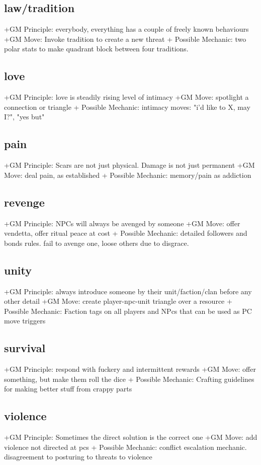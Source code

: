 \documentclass{tufte-handout}
\begin{document}
\subsection{law/tradition}
+GM Principle: everybody, everything has a couple of freely known behaviours
+GM Move: Invoke tradition to create a new threat
+ Possible Mechanic: two polar stats to make quadrant block between four traditions. 

\subsection{love}
+GM Principle:  love is steadily rising level of intimacy
+GM Move: spotlight a connection or triangle
+ Possible Mechanic: intimacy moves: 	 "i'd like to X, may I?", "yes but"

\subsection{pain}
+GM Principle: Scars are not just physical. Damage is not just permanent
+GM Move: deal pain, as established
+ Possible Mechanic: memory/pain as addiction 

\subsection{revenge}

+GM Principle: NPCs will always be avenged by someone
+GM Move:  offer vendetta, offer ritual peace at cost
+ Possible Mechanic: detailed followers and bonds rules. fail to avenge one, loose others due to disgrace.

\subsection{unity}
+GM Principle: always introduce someone by their unit/faction/clan before any other detail	
+GM Move: create player-npc-unit triangle over a resource 	
+ Possible Mechanic: Faction tags on all players and NPcs that can be used as PC move triggers


\subsection{survival}
+GM Principle: respond with fuckery and intermittent rewards
+GM Move:  offer something, but make them roll the dice
+ Possible Mechanic: Crafting guidelines for making better stuff from crappy parts

\subsection{violence}
+GM Principle: Sometimes the direct solution is the correct one
+GM Move: 	add violence not directed at pcs
+ Possible Mechanic: conflict escalation mechanic. disagreement to posturing to threats to violence 
\end{document}
